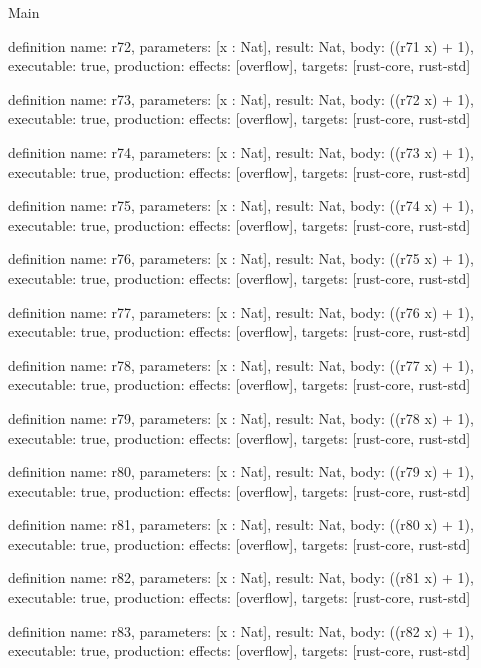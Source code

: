 \begin{lexlean}{Main}
\begin{semanticmodule}
definition{
  name: r72,
  parameters: [x : Nat],
  result: Nat,
  body: ((r71 x) + 1),
  executable: true,
  production: {effects: [overflow], targets: [rust-core, rust-std]}
}

definition{
  name: r73,
  parameters: [x : Nat],
  result: Nat,
  body: ((r72 x) + 1),
  executable: true,
  production: {effects: [overflow], targets: [rust-core, rust-std]}
}

definition{
  name: r74,
  parameters: [x : Nat],
  result: Nat,
  body: ((r73 x) + 1),
  executable: true,
  production: {effects: [overflow], targets: [rust-core, rust-std]}
}

definition{
  name: r75,
  parameters: [x : Nat],
  result: Nat,
  body: ((r74 x) + 1),
  executable: true,
  production: {effects: [overflow], targets: [rust-core, rust-std]}
}

definition{
  name: r76,
  parameters: [x : Nat],
  result: Nat,
  body: ((r75 x) + 1),
  executable: true,
  production: {effects: [overflow], targets: [rust-core, rust-std]}
}

definition{
  name: r77,
  parameters: [x : Nat],
  result: Nat,
  body: ((r76 x) + 1),
  executable: true,
  production: {effects: [overflow], targets: [rust-core, rust-std]}
}

definition{
  name: r78,
  parameters: [x : Nat],
  result: Nat,
  body: ((r77 x) + 1),
  executable: true,
  production: {effects: [overflow], targets: [rust-core, rust-std]}
}

definition{
  name: r79,
  parameters: [x : Nat],
  result: Nat,
  body: ((r78 x) + 1),
  executable: true,
  production: {effects: [overflow], targets: [rust-core, rust-std]}
}

definition{
  name: r80,
  parameters: [x : Nat],
  result: Nat,
  body: ((r79 x) + 1),
  executable: true,
  production: {effects: [overflow], targets: [rust-core, rust-std]}
}

definition{
  name: r81,
  parameters: [x : Nat],
  result: Nat,
  body: ((r80 x) + 1),
  executable: true,
  production: {effects: [overflow], targets: [rust-core, rust-std]}
}

definition{
  name: r82,
  parameters: [x : Nat],
  result: Nat,
  body: ((r81 x) + 1),
  executable: true,
  production: {effects: [overflow], targets: [rust-core, rust-std]}
}

definition{
  name: r83,
  parameters: [x : Nat],
  result: Nat,
  body: ((r82 x) + 1),
  executable: true,
  production: {effects: [overflow], targets: [rust-core, rust-std]}
}


\end{semanticmodule}
\end{lexlean}
